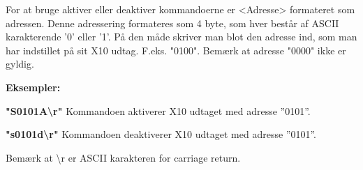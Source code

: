 For at bruge aktiver eller deaktiver kommandoerne er <Adresse> formateret som adressen. Denne adressering formateres som 4 byte, som hver består af ASCII karakterende '0' eller '1'. På den måde skriver man blot den adresse ind, som man har indstillet på sit X10 udtag. F.eks. "0100".
Bemærk at adresse "0000" ikke er gyldig.

\textbf{Eksempler:}

\textbf{"S0101A\textbackslash r"}
Kommandoen aktiverer X10 udtaget med adresse ''0101''.

\textbf{"s0101d\textbackslash r"}
Kommandoen deaktiverer X10 udtaget med adresse ''0101''.

Bemærk at \textbackslash r er ASCII karakteren for carriage return.

